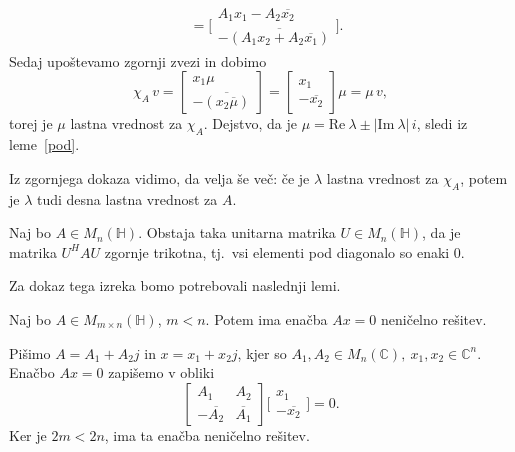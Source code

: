 \documentclass[mat1, tisk]{fmfdelo}
\numberwithin{equation}{section}
\begin{document}
\begin{dokaz}
\begin{equation*}
\begin{aligned}
            &=
            \Bigg[\begin{matrix}
                A_1x_1 - A_2\overline{x_2}\\
                - \overline{(A_1 x_2 + A_2 \overline{x_1})}
            \end{matrix}\Bigg].
        \end{aligned}
    \end{equation*}
    Sedaj upoštevamo zgornji zvezi in dobimo
    \begin{equation*}
        \chi_A \, v =
        \begin{bmatrix}
            x_1 \mu \\
            - \overline{(x_2 \overline{\mu})}
        \end{bmatrix}
        =
        \begin{bmatrix}
            x_1 \\
            - \overline{x_2}
        \end{bmatrix}    
        \mu
        =\mu \, v,
    \end{equation*}
    torej je $\mu$ lastna vrednost za $\chi_A$. Dejstvo, da je $\mu = \mathrm{Re} \: \lambda \pm |\mathrm{Im} \: \lambda| \, i$, sledi 
    iz leme~\ref{pod}.
\end{dokaz}

\begin{opomba}\label{lastna vrednost adjungiranke}
    Iz zgornjega dokaza vidimo, da velja še več: če je $\lambda$ lastna vrednost za $\chi_A$,
    potem je $\lambda$ tudi desna lastna vrednost za $A$.
\end{opomba}

\begin{izrek}\label{zgornje trikotna}
    Naj bo $A \in M_{n}(\mathbb{H})$. Obstaja taka unitarna matrika $U \in M_{n}(\mathbb{H})$, da je matrika
    $U^{H}AU$ zgornje trikotna, tj.\ vsi elementi pod diagonalo so enaki 0.
\end{izrek}

Za dokaz tega izreka bomo potrebovali naslednji lemi.

\begin{lema}\label{nenicelna resitev}
    Naj bo $A \in M_{m \times n}(\mathbb{H})$, $m < n$. Potem ima enačba $Ax = 0$ neničelno rešitev.
\end{lema}

\begin{dokaz}
    Pišimo $A = A_1 + A_2j$ in $x = x_1 + x_2j$, kjer so 
    $A_1, A_2 \in M_{n}(\mathbb{C}), \: x_1, x_2 \in \mathbb{C}^n$. Enačbo $Ax = 0$ zapišemo v obliki
    $$\begin{bmatrix}
        A_{1} & A_{2}\\
        - \overline{A_{2}} & \overline{A_{1}} 
    \end{bmatrix}
    \Bigg[\begin{matrix}
        x_1\\
        - \overline{x_2}
    \end{matrix}\Bigg]
    = 0.$$
    Ker je $2m < 2n$, ima ta enačba neničelno rešitev.
\end{dokaz}
\end{document}
